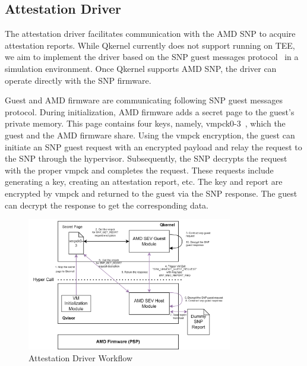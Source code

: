 \subsection{Attestation Driver}
The attestation driver facilitates communication with the AMD SNP to acquire attestation reports. While Qkernel currently does not support running on TEE, we aim to implement the driver based on the SNP  guest messages protocol~\cite*{snp_firmware} in a simulation environment. Once Qkernel supports 
AMD SNP, the driver can operate directly with the SNP firmware. 


Guest and AMD firmware are communicating following SNP guest messages protocol. During initialization, AMD firmware adds a secret page to the guest's private memory. This page contains four keys, namely, vmpck0-3~\cite*{snp_firmware}, which the guest and the AMD firmware share. Using the vmpck encryption,  the guest 
can initiate an SNP guest request with an encrypted payload and relay the request to the SNP through the hypervisor. Subsequently, the SNP decrypts the request with the proper vmpck and completes the request. These requests include generating a key, creating an attestation report, etc. The key and 
report are encrypted by vmpck and returned to the guest via the SNP response. The guest can decrypt the response to get the corresponding data.

\begin{figure}[htp]
    \centering
    \includegraphics[width=0.8\textwidth]{images/amd_snp_driver.png}
    \caption[Attestation Driver Workflow]{Attestation Driver Workflow}
    \label{fig:amd_snp_driver}
\end{figure}

